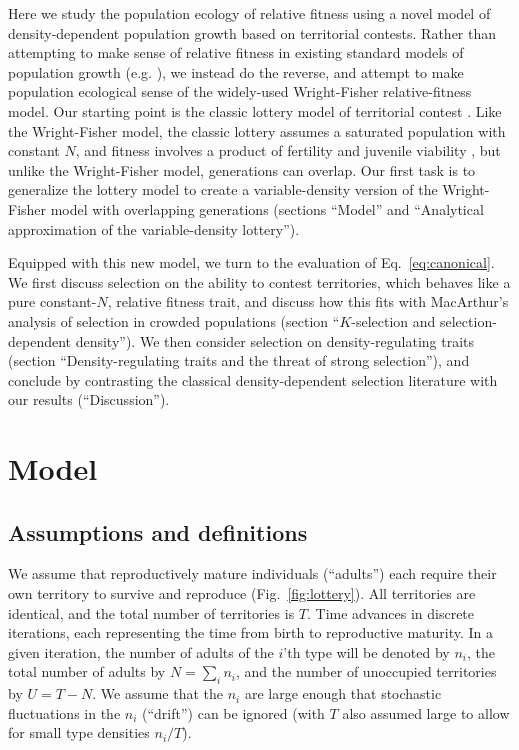 \documentclass[12pt]{article}
\begin{document}
Here we study the population ecology of relative fitness using a novel model of density-dependent population growth based on territorial contests. Rather than attempting to make sense of relative fitness in existing standard models of population growth (e.g. \citep{kimura1969natural,mallet_2012}), we instead do the reverse, and attempt to make population ecological sense of the widely-used Wright-Fisher relative-fitness model. Our starting point is the classic lottery model of territorial contest \citep{sale_77,chesson_1981}. Like the Wright-Fisher model, the classic lottery assumes a saturated population with constant $N$, and fitness involves a product of fertility and juvenile viability \citep[pp. 185]{crow_1970}, but unlike the Wright-Fisher model, generations can overlap. Our first task is to generalize the lottery model to create a variable-density version of the Wright-Fisher model with overlapping generations (sections ``Model'' and ``Analytical approximation of the variable-density lottery''). 

Equipped with this new model, we turn to the evaluation of Eq.~\eqref{eq:canonical}. We first discuss selection on the ability to contest territories, which behaves like a pure constant-$N$, relative fitness trait, and discuss how this fits with MacArthur's analysis of selection in crowded populations (section ``$K$-selection and selection-dependent density''). We then consider selection on density-regulating traits (section ``Density-regulating traits and the threat of strong selection''), and conclude by contrasting the classical density-dependent selection literature with our results (``Discussion'').
 
\section*{Model}\label{sec:model}

\subsection*{Assumptions and definitions} 

We assume that reproductively mature individuals (``adults'') each require their own territory to survive and reproduce (Fig.~\ref{fig:lottery}). All territories are identical, and the total number of territories is $T$. Time advances in discrete iterations, each representing the time from birth to reproductive maturity. In a given iteration, the number of adults of the $i$'th type will be denoted by $n_i$, the total number of adults by $N=\sum_i n_i$, and the number of unoccupied territories by $U=T-N$. We assume that the $n_i$ are large enough that stochastic fluctuations in the $n_i$ (``drift'') can be ignored (with $T$ also assumed large to allow for small type densities $n_i/T$).
\end{document}
